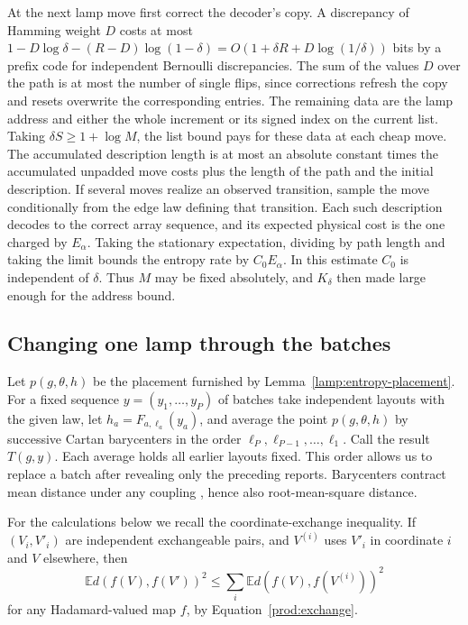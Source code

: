 At the next lamp move first correct the decoder's copy. A discrepancy
of Hamming weight \(D\) costs at most
\(1-D\log\delta-(R-D)\log(1-\delta)
=O(1+\delta R+D\log(1/\delta))\) bits by a prefix code for independent
Bernoulli discrepancies. The sum of the values \(D\) over the path
is at most the number of single flips, since corrections refresh the copy
and resets overwrite the corresponding entries. The remaining data are
the lamp address and either the whole increment or its signed index
on the current list. Taking \(\delta S\ge1+\log M\), the list bound pays
for these data at each cheap move. The accumulated description length
is at most an absolute constant times the accumulated unpadded move costs
plus the length of the path and the initial description. If several moves realize an observed
transition, sample the move conditionally from the edge law defining that transition. Each such
description decodes to the correct array sequence, and its expected
physical cost is the one charged by \(E_\alpha\). Taking the stationary
expectation, dividing by path length and taking the limit bounds the
entropy rate by \(C_0E_\alpha\). In this estimate \(C_0\) is independent
of \(\delta\). Thus \(M\) may be fixed absolutely, and \(K_\delta\)
then made large enough for the address bound.

\subsection{Changing one lamp through the batches}

Let \(p(g,\theta,h)\) be the placement furnished by
Lemma~\ref{lamp:entropy-placement}. For a fixed sequence
\(y=(y_1,\ldots,y_P)\) of batches take independent layouts with the
given law, let \(h_a=F_{a,\ell_a}(y_a)\), and average the point
\(p(g,\theta,h)\) by successive Cartan barycenters in the order
\(\ell_P,\ell_{P-1},\ldots,\ell_1\). Call the result \(T(g,y)\).
Each average holds all earlier layouts fixed. This order allows us to
replace a batch after revealing only the preceding reports.
Barycenters contract mean distance under any coupling
\cite{Sturm}, hence also root-mean-square distance.

For the calculations below we recall the coordinate-exchange inequality.
If \((V_i,V'_i)\) are independent exchangeable pairs, and \(V^{(i)}\)
uses \(V'_i\) in coordinate \(i\) and \(V\) elsewhere, then
\begin{equation}\label{lamp:exchange}
 \mathbb E d(f(V),f(V'))^2
 \le\sum_i\mathbb E d(f(V),f(V^{(i)}))^2
\end{equation}
for any Hadamard-valued map \(f\), by Equation~\eqref{prod:exchange}.

